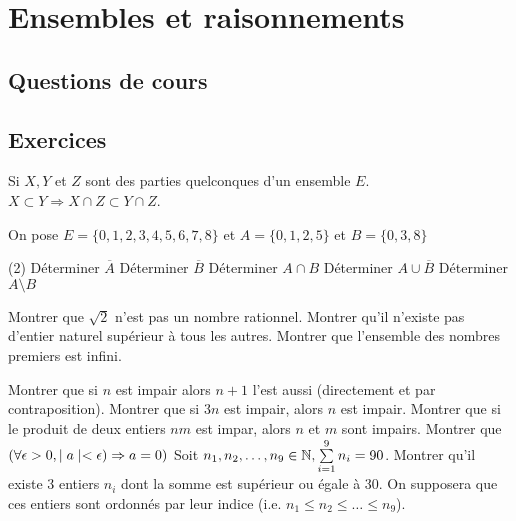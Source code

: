  \chapter{Ensembles et raisonnements}



\section{Questions de cours}	




\section{Exercices}

\begin{exercise}[subtitle= Inclusion et intersection]
	Si $X, Y$ et $Z$ sont des parties quelconques d'un ensemble $E$.
	\Mq $X \subset Y \Rightarrow X\cap Z \subset Y \cap Z$.
\end{exercise}


\begin{exercise}[subtitle= Inclusion et intersection]
On pose $E=\lbrace 0,1,2,3,4,5,6,7,8\rbrace$ et $A=\lbrace 0, 1,2,5\rbrace$ et $B=\lbrace 0,3,8\rbrace$
\begin{tasks} (2)
	\task Déterminer $\overline{A}$
	\task  Déterminer $\overline{B}$
	\task Déterminer $A\cap B$
	\task Déterminer $A\cup\overline{B}$
	\task Déterminer $A\setminus B$
\end{tasks} 
\end{exercise}





\begin{exercise}[subtitle= Absurde]
	\begin{tasks} 
		\task 	Montrer que $\sqrt{2}$  n'est pas un nombre rationnel.
		\task Montrer qu'il n'existe pas d'entier naturel supérieur à tous les autres. 
		\task Montrer que l'ensemble des nombres premiers est infini.   
	\end{tasks}
\end{exercise}

\begin{exercise}[subtitle= Contraposition]
		\begin{tasks} 
			\task Montrer que si $n$ est impair alors $n+1$ l'est aussi (directement et par contraposition).
			\task Montrer que si $3n$ est impair, alors $n$ est impair.  
			\task Montrer que si le produit de deux entiers $nm$ est impar, alors $n$ et $m$ sont impairs. 
			\task Montrer que $(\forall \epsilon > 0, \mid a \mid < \epsilon) \Rightarrow a=0 )$
			\task Soit $n_1, n_2, \dots, n_9 \in \mathbb{N}, \sum\limits_{i=1}^9 n_i =90$. Montrer qu'il existe 3 entiers $n_i$ dont la somme est supérieur ou égale à 30. On supposera que ces entiers sont ordonnés par leur indice (i.e. $n_1 \le n_2 \le \dots \le n_9$). 
		\end{tasks}
\end{exercise}



